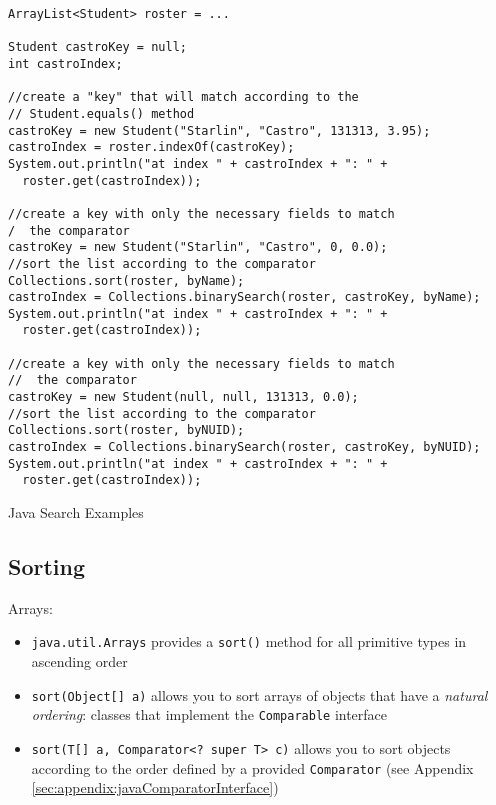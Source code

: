 \begin{listing}[H]
\begin{verbatim}
ArrayList<Student> roster = ...
		
Student castroKey = null;
int castroIndex;
		
//create a "key" that will match according to the 
// Student.equals() method
castroKey = new Student("Starlin", "Castro", 131313, 3.95);
castroIndex = roster.indexOf(castroKey);
System.out.println("at index " + castroIndex + ": " + 
  roster.get(castroIndex));

//create a key with only the necessary fields to match 
/  the comparator
castroKey = new Student("Starlin", "Castro", 0, 0.0);
//sort the list according to the comparator
Collections.sort(roster, byName);
castroIndex = Collections.binarySearch(roster, castroKey, byName);
System.out.println("at index " + castroIndex + ": " + 
  roster.get(castroIndex));

//create a key with only the necessary fields to match 
//  the comparator
castroKey = new Student(null, null, 131313, 0.0);
//sort the list according to the comparator
Collections.sort(roster, byNUID);
castroIndex = Collections.binarySearch(roster, castroKey, byNUID);
System.out.println("at index " + castroIndex + ": " + 
  roster.get(castroIndex));
\end{verbatim}
\caption{Java Search Examples}
\end{listing}

\subsection{Sorting}

Arrays:
\begin{itemize}
  \item \texttt{java.util.Arrays} provides a \texttt{sort()} method for all primitive types in ascending order
  \item \texttt{sort(Object[] a)} allows you to sort arrays of objects that have a \emph{natural ordering}: classes that implement the \texttt{Comparable} interface
  \item \texttt{sort(T[] a, Comparator<? super T> c)} allows you to sort objects according to the order defined by a provided \texttt{Comparator} (see Appendix \ref{sec:appendix:javaComparatorInterface})
\end{itemize}

